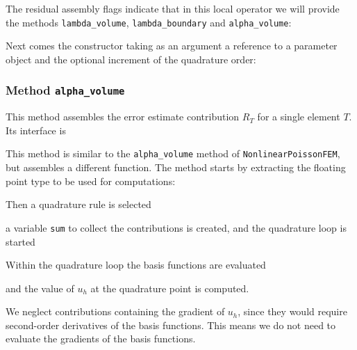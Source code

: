 \documentclass[a4paper,12pt]{article}
\begin{document}
The residual assembly flags indicate that in this local operator we will provide
the methods \lstinline{lambda_volume}, \lstinline{lambda_boundary}
and \lstinline{alpha_volume}:


Next comes the constructor taking as an argument a reference to a
parameter object and the optional increment of the quadrature order:


\subsubsection*{Method \lstinline{alpha_volume}}

This method assembles the error estimate contribution $R_T$ for a single element $T$.
Its interface is


This method is similar to the \lstinline{alpha_volume} method of
\lstinline{NonlinearPoissonFEM}, but assembles a different function.
The method starts by extracting the floating point type to be used for
computations:


Then a quadrature rule is selected

a variable \lstinline{sum} to collect the contributions is created, and the
quadrature loop is started


Within the quadrature loop the basis functions are evaluated

and the value of $u_h$ at the quadrature point is computed.

We neglect contributions containing the gradient of $u_h$, since they
would require second-order derivatives of the basis functions. This means we
do not need to evaluate the gradients of the basis functions.
\end{document}

